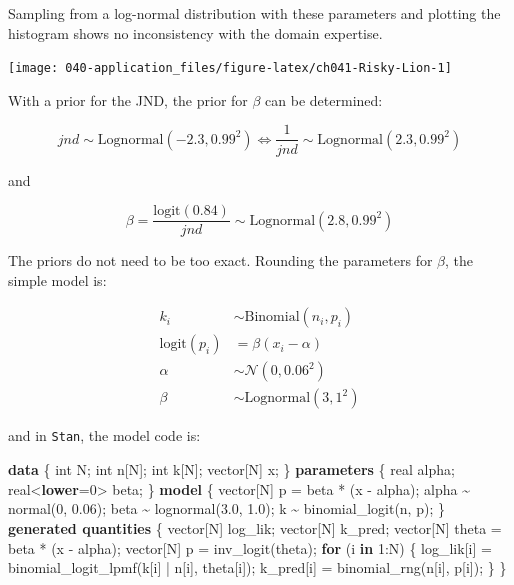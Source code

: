 \documentclass[11pt, oneside, openany]{scrbook}
\newenvironment{Shaded}{\begin{snugshade}}{\end{snugshade}}
\newcommand{\ControlFlowTok}[1]{\textcolor[rgb]{0.13,0.29,0.53}{\textbf{#1}}}
\newcommand{\DataTypeTok}[1]{\textcolor[rgb]{0.13,0.29,0.53}{#1}}
\newcommand{\DecValTok}[1]{\textcolor[rgb]{0.00,0.00,0.81}{#1}}
\newcommand{\FloatTok}[1]{\textcolor[rgb]{0.00,0.00,0.81}{#1}}
\newcommand{\KeywordTok}[1]{\textcolor[rgb]{0.13,0.29,0.53}{\textbf{#1}}}
\newcommand{\NormalTok}[1]{#1}
\begin{document}

Sampling from a log-normal distribution with these parameters and plotting the histogram shows no inconsistency with the domain expertise.

\begin{center}\texttt{[image: 040-application\_files/figure-latex/ch041-Risky-Lion-1]} \end{center}

With a prior for the JND, the prior for \(\beta\) can be determined:


\[
jnd \sim \mathrm{Lognormal}(-2.3, 0.99^2) \Longleftrightarrow \frac{1}{jnd} \sim \mathrm{Lognormal}(2.3, 0.99^2)
\]

and

\[
\beta = \frac{\mathrm{logit}(0.84)}{jnd} \sim \mathrm{Lognormal}(2.8, 0.99^2)
\]

The priors do not need to be too exact. Rounding the parameters for \(\beta\), the simple model is:

\begin{align*}
  k_i &\sim \mathrm{Binomial}(n_i, p_i) \\
  \mathrm{logit}(p_i) &= \beta ( x_i - \alpha ) \\
  \alpha &\sim \mathcal{N}(0, 0.06^2) \\
  \beta &\sim \mathrm{Lognormal}(3, 1^2)
\end{align*}

and in \texttt{Stan}, the model code is:

\begin{Shaded}
\begin{Highlighting}[]
\KeywordTok{data}\NormalTok{ \{}
  \DataTypeTok{int}\NormalTok{ N;}
  \DataTypeTok{int}\NormalTok{ n[N];}
  \DataTypeTok{int}\NormalTok{ k[N];}
  \DataTypeTok{vector}\NormalTok{[N] x;}
\NormalTok{\}}
\KeywordTok{parameters}\NormalTok{ \{}
  \DataTypeTok{real}\NormalTok{ alpha;}
  \DataTypeTok{real}\NormalTok{\textless{}}\KeywordTok{lower}\NormalTok{=}\DecValTok{0}\NormalTok{\textgreater{} beta;}
\NormalTok{\}}
\KeywordTok{model}\NormalTok{ \{}
  \DataTypeTok{vector}\NormalTok{[N] p = beta * (x {-} alpha);}
\NormalTok{  alpha \textasciitilde{} normal(}\DecValTok{0}\NormalTok{, }\FloatTok{0.06}\NormalTok{);}
\NormalTok{  beta \textasciitilde{} lognormal(}\FloatTok{3.0}\NormalTok{, }\FloatTok{1.0}\NormalTok{);}
\NormalTok{  k \textasciitilde{} binomial\_logit(n, p);}
\NormalTok{\}}
\KeywordTok{generated quantities}\NormalTok{ \{}
  \DataTypeTok{vector}\NormalTok{[N] log\_lik;}
  \DataTypeTok{vector}\NormalTok{[N] k\_pred;}
  \DataTypeTok{vector}\NormalTok{[N] theta = beta * (x {-} alpha);}
  \DataTypeTok{vector}\NormalTok{[N] p = inv\_logit(theta);}
  \ControlFlowTok{for}\NormalTok{ (i }\ControlFlowTok{in} \DecValTok{1}\NormalTok{:N) \{}
\NormalTok{    log\_lik[i] = binomial\_logit\_lpmf(k[i] | n[i], theta[i]);}
\NormalTok{    k\_pred[i]  = binomial\_rng(n[i], p[i]);}
\NormalTok{  \}}
\NormalTok{\}}
\end{Highlighting}
\end{Shaded}
\end{document}
